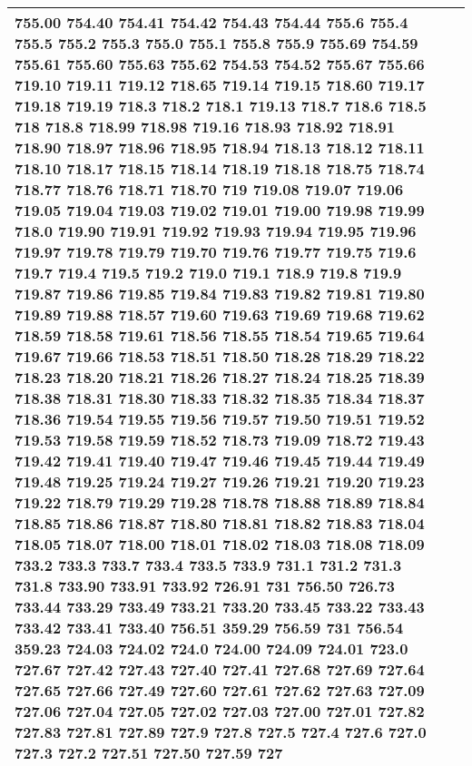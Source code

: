 \begin{longtable}{|R{.05in}|L{.5in}||L{5.75in}|}
755.00 754.40 754.41 754.42 754.43 754.44 755.6 755.4 755.5 755.2 755.3 755.0 755.1 755.8 755.9 755.69 754.59 755.61 755.60 755.63 755.62 754.53 754.52 755.67 755.66 719.10 719.11 719.12 718.65 719.14 719.15 718.60 719.17 719.18 719.19 718.3 718.2 718.1 719.13 718.7 718.6 718.5 718 718.8 718.99 718.98 719.16 718.93 718.92 718.91 718.90 718.97 718.96 718.95 718.94 718.13 718.12 718.11 718.10 718.17 718.15 718.14 718.19 718.18 718.75 718.74 718.77 718.76 718.71 718.70 719 719.08 719.07 719.06 719.05 719.04 719.03 719.02 719.01 719.00 719.98 719.99 718.0 719.90 719.91 719.92 719.93 719.94 719.95 719.96 719.97 719.78 719.79 719.70 719.76 719.77 719.75 719.6 719.7 719.4 719.5 719.2 719.0 719.1 718.9 719.8 719.9 719.87 719.86 719.85 719.84 719.83 719.82 719.81 719.80 719.89 719.88 718.57 719.60 719.63 719.69 719.68 719.62 718.59 718.58 719.61 718.56 718.55 718.54 719.65 719.64 719.67 719.66 718.53 718.51 718.50 718.28 718.29 718.22 718.23 718.20 718.21 718.26 718.27 718.24 718.25 718.39 718.38 718.31 718.30 718.33 718.32 718.35 718.34 718.37 718.36 719.54 719.55 719.56 719.57 719.50 719.51 719.52 719.53 719.58 719.59 718.52 718.73 719.09 718.72 719.43 719.42 719.41 719.40 719.47 719.46 719.45 719.44 719.49 719.48 719.25 719.24 719.27 719.26 719.21 719.20 719.23 719.22 718.79 719.29 719.28 718.78 718.88 718.89 718.84 718.85 718.86 718.87 718.80 718.81 718.82 718.83 718.04 718.05 718.07 718.00 718.01 718.02 718.03 718.08 718.09 733.2 733.3 733.7 733.4 733.5 733.9 731.1 731.2 731.3 731.8 733.90 733.91 733.92 726.91 731 756.50 726.73 733.44 733.29 733.49 733.21 733.20 733.45 733.22 733.43 733.42 733.41 733.40 756.51 359.29 756.59 731 756.54 359.23 724.03 724.02 724.0 724.00 724.09 724.01 723.0 727.67 727.42 727.43 727.40 727.41 727.68 727.69 727.64 727.65 727.66 727.49 727.60 727.61 727.62 727.63 727.09 727.06 727.04 727.05 727.02 727.03 727.00 727.01 727.82 727.83 727.81 727.89 727.9 727.8 727.5 727.4 727.6 727.0 727.3 727.2 727.51 727.50 727.59 727\\\hline

\end{longtable}
